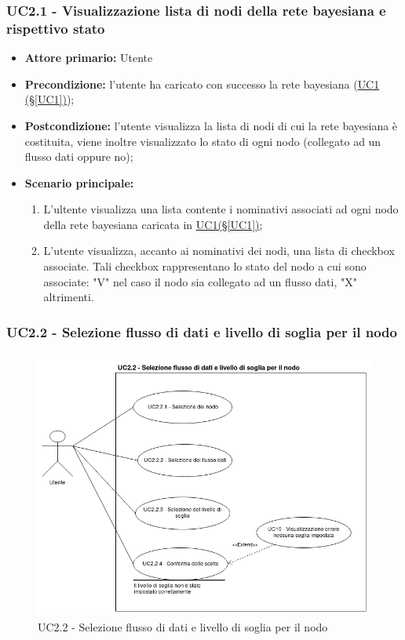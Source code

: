 \subsubsection{UC2.1 - Visualizzazione lista di nodi della rete bayesiana e rispettivo stato}\label{UC2.1}
\begin{itemize}
\item \textbf{Attore primario:}  Utente
\item \textbf{Precondizione:} l'utente ha caricato con successo la rete bayesiana (\hyperref[UC1]{UC1 									(§\ref*{UC1})});
\item \textbf{Postcondizione:} l'utente visualizza la lista di nodi di cui la rete bayesiana è costituita, viene 			inoltre visualizzato lo stato di ogni nodo (collegato ad un flusso dati oppure no);
\item \textbf{Scenario principale:}
	\begin{enumerate}
	\item L'ultente visualizza una lista contente i nominativi associati ad ogni nodo della rete bayesiana caricata 				in \hyperref[UC1]{UC1(§\ref*{UC1})};
	\item L'utente visualizza, accanto ai nominativi dei nodi, una lista di checkbox associate. Tali checkbox 							rappresentano lo stato del nodo a cui sono associate: "V" nel caso il nodo sia collegato ad un flusso dati, "X" 		altrimenti.
	\end{enumerate}
\end{itemize}

\pagebreak

\subsubsection{UC2.2 - Selezione flusso di dati e livello di soglia per il nodo}\label{UC2.2}

\begin{figure}[H]
\centering
\includegraphics[scale=0.5]{./images/UC2-2.png}
\caption{UC2.2 - Selezione flusso di dati e livello di soglia per il nodo}
\end{figure}

